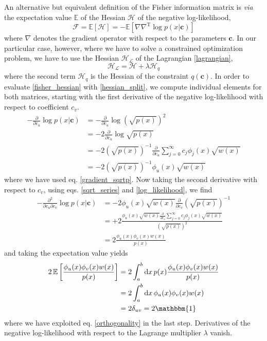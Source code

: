 \documentclass[]{report}
\begin{document}
		An alternative but equivalent definition of the Fisher information matrix is \textit{via} the expectation value $\mathbb{E}$ of the Hessian $\bm{\mathcal{H}}$ of the negative log-likelihood,
		\begin{equation}\label{fisher_hessian}
			\bm{\mathcal{F}} = \mathbb{E}\left[\bm{\mathcal{H}}\right] = -\mathbb{E}\left[\nabla\nabla^\mathrm{T}\log p(x\vert\mathbf{c})\right]
		\end{equation}
		where $\nabla$ denotes the gradient operator with respect to the parameters $\mathbf{c}$. In our particular case, however, where we have to solve a constrained optimization problem, we have to use the Hessian $\bm{\mathcal{H}}_\mathcal{L}$ of the Lagrangian \ref{lagrangian},
		\begin{equation}\label{hessian_split}
			\bm{\mathcal{H}}_\mathcal{L} = \bm{\mathcal{H}} + \lambda\bm{\mathcal{H}}_q
		\end{equation}
		where the second term $\bm{\mathcal{H}}_q$ is the Hessian of the constraint $q(\mathbf{c})$. In order to evaluate \ref{fisher_hessian} with \ref{hessian_split}, we compute individual elements for both matrices, starting with the first derivative of the negative log-likelihood with respect to coefficient $c_v$.
		\begin{align}\label{gradient_logp}
			-\frac{\partial}{\partial c_u}\log p(x\vert\mathbf{c}) & = -\frac{\partial}{\partial 	c_u}\log\left(\sqrt{p(x)}\right)^2 \nonumber \\
			& = -2\frac{\partial}{\partial c_u}\log\sqrt{p(x)} \\
			& = -2\left(\sqrt{p(x)}\right)^{-1}\frac{\partial}{\partial c_u}\sum_{j=0}^{\infty}c_j\phi_j(x)\sqrt{w(x)} \nonumber \\
			& = -2\left(\sqrt{p(x)}\right)^{-1}\phi_u(x)\sqrt{w(x)} \nonumber
		\end{align}
		where we have used eq. \ref{gradient_sqrtp}. Now taking the second derivative with respect to $c_v$, using eqs. \ref{sqrt_series} and \ref{log_likelihood}, we find
		\begin{align}\label{hessian_logp}
			-\frac{\partial^2}{\partial c_u\partial c_v}\log p(x\vert\mathbf{c}) & = -2\phi_u(x)\sqrt{w(x)}\frac{\partial}{\partial c_v}\left(\sqrt{p(x)}\right)^{-1} \nonumber \\
			& = +2\frac{\phi_u(x)\sqrt{w(x)}\frac{\partial}{\partial c_v}\sum_{j=0}^{\infty}c_j\phi_j(x)\sqrt{w(x)}}{\left(\sqrt{p(x)}\right)^{2}} \nonumber \\
			& = 2\frac{\phi_u(x)\phi_v(x)w(x)}{p(x)}
		\end{align}
		and taking the expectation value yields
		\begin{align}
			2\,\mathbb{E}\left[\frac{\phi_u(x)\phi_v(x)w(x)}{p(x)}\right] & = 	2\int_a^b\mathrm{d}x\,p(x)\frac{\phi_u(x)\phi_v(x)w(x)}{p(x)} \nonumber \\
			& = 2\int_a^b\mathrm{d}x\,\phi_u(x)\phi_v(x)w(x) \\
			& = 2\delta_{uv} = 2 \mathbbm{1} \nonumber
		\end{align}
		where we have exploited eq. \ref{orthogonality} in the last step. Derivatives of the negative log-likelihood with respect to the Lagrange multiplier $\lambda$ vanish.
		
\end{document}
